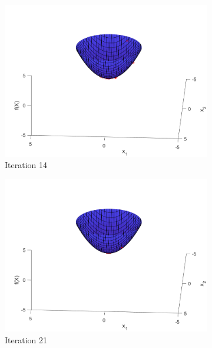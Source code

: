 \begin{figure}
\begin{subfigure}[b]{0.4\textwidth}
    \includegraphics[width=\textwidth]{img/smpl/sphr/loa-iter-14}
    \caption{Iteration 14}
    \label{fig:s2-iter-2}
  \end{subfigure}
  \begin{subfigure}[b]{0.4\textwidth}
    \includegraphics[width=\textwidth]{img/smpl/sphr/loa-iter-21}
    \caption{Iteration 21}
    \label{fig:s2-iter-3}
  \end{subfigure}
  \begin{subfigure}[b]{0.4\textwidth}

\end{subfigure}
\end{figure}
